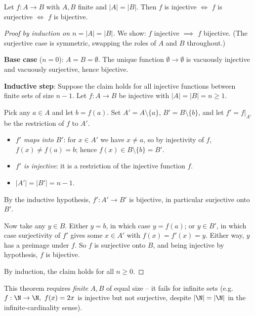 \begin{theorem}
Let $f: A \to B$ with $A, B$ finite and $|A| = |B|$. Then $f$ is injective $\iff$ $f$ is surjective $\iff$ $f$ is bijective.
\end{theorem}
\begin{proof}[Proof by induction on $n = |A| = |B|$]
We show: $f$ injective $\implies$ $f$ bijective. (The surjective case is symmetric, swapping the roles of $A$ and $B$ throughout.)

\textbf{Base case} ($n=0$): $A = B = \emptyset$. The unique function $\emptyset \to \emptyset$ is vacuously injective and vacuously surjective, hence bijective.

\textbf{Inductive step}: Suppose the claim holds for all injective functions between finite sets of size $n-1$. Let $f: A \to B$ be injective with $|A| = |B| = n \ge 1$.

Pick any $a \in A$ and let $b = f(a)$. Set $A' = A \setminus \{a\}$, $B' = B \setminus \{b\}$, and let $f' = f|_{A'}$ be the restriction of $f$ to $A'$.

\begin{itemize}
    \item \emph{$f'$ maps into $B'$}: for $x \in A'$ we have $x \neq a$, so by injectivity of $f$, $f(x) \neq f(a) = b$; hence $f(x) \in B \setminus \{b\} = B'$.
    \item \emph{$f'$ is injective}: it is a restriction of the injective function $f$.
    \item $|A'| = |B'| = n-1$.
\end{itemize}

By the inductive hypothesis, $f' : A' \to B'$ is bijective, in particular surjective onto $B'$.

Now take any $y \in B$. Either $y = b$, in which case $y = f(a)$; or $y \in B'$, in which case surjectivity of $f'$ gives some $x \in A'$ with $f(x) = f'(x) = y$. Either way, $y$ has a preimage under $f$. So $f$ is surjective onto $B$, and being injective by hypothesis, $f$ is bijective.

By induction, the claim holds for all $n \ge 0$.
\end{proof}

\begin{note}
This theorem requires \emph{finite} $A, B$ of equal size -- it fails for infinite sets (e.g.\ $f:\N\to\N,\ f(x)=2x$ is injective but not surjective, despite $|\N|=|\N|$ in the infinite-cardinality sense).
\end{note}


